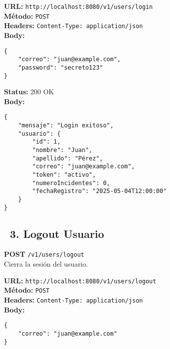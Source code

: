 \begin{tcolorbox}[request]
    \textbf{URL:} \textcolor{urlColor}{\texttt{http://localhost:8080/v1/users/login}}\\
    \textbf{Método:} \textcolor{methodColor}{\texttt{POST}}\\
    \textbf{Headers:} \textcolor{headerColor}{\texttt{Content-Type: application/json}}\\
    \textbf{Body:}
    \begin{verbatim}
{
    "correo": "juan@example.com",
    "password": "secreto123"
}
    \end{verbatim}
\end{tcolorbox}

\begin{tcolorbox}[response]
    \textbf{Status:} 200 OK\\
    \textbf{Body:}
    \begin{verbatim}
{
    "mensaje": "Login exitoso",
    "usuario": {
        "id": 1,
        "nombre": "Juan",
        "apellido": "Pérez",
        "correo": "juan@example.com",
        "token": "activo",
        "numeroIncidentes": 0,
        "fechaRegistro": "2025-05-04T12:00:00"
    }
}
    \end{verbatim}
\end{tcolorbox}

\subsection*{\faServer\ 3. Logout Usuario}
\begin{tcolorbox}[endpoint]
    \textbf{POST} \texttt{/v1/users/logout}\\
    Cierra la sesión del usuario.
\end{tcolorbox}

\begin{tcolorbox}[request]
    \textbf{URL:} \textcolor{urlColor}{\texttt{http://localhost:8080/v1/users/logout}}\\
    \textbf{Método:} \textcolor{methodColor}{\texttt{POST}}\\
    \textbf{Headers:} \textcolor{headerColor}{\texttt{Content-Type: application/json}}\\
    \textbf{Body:}
    \begin{verbatim}
{
    "correo": "juan@example.com"
}
    \end{verbatim}
\end{tcolorbox}

